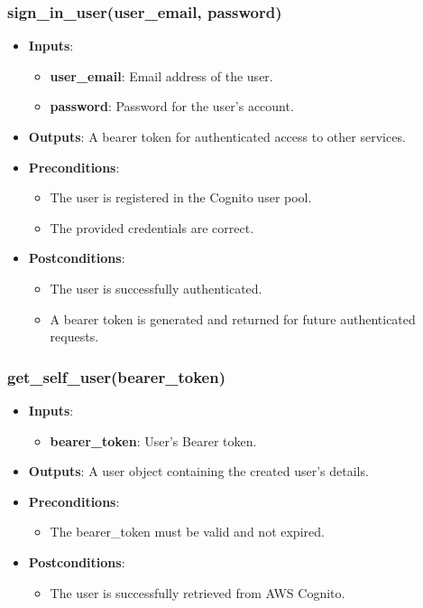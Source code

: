\documentclass[12pt, titlepage]{article}
\begin{document}
\subsubsection{sign\_in\_user(user\_email, password)}
\begin{itemize}
    \item \textbf{Inputs}:
        \begin{itemize}
            \item \textbf{user\_email}: Email address of the user.
            \item \textbf{password}: Password for the user's account.
        \end{itemize}
    \item \textbf{Outputs}: A bearer token for authenticated access to other services.
    \item \textbf{Preconditions}: 
        \begin{itemize}
            \item The user is registered in the Cognito user pool.
            \item The provided credentials are correct.
        \end{itemize}
    \item \textbf{Postconditions}: 
        \begin{itemize}
            \item The user is successfully authenticated.
            \item A bearer token is generated and returned for future authenticated requests.
        \end{itemize}
\end{itemize}

\subsubsection{get\_self\_user(bearer\_token)}
\begin{itemize}
    \item \textbf{Inputs}:
        \begin{itemize}
            \item \textbf{bearer\_token}: User's Bearer token.
        \end{itemize}
    \item \textbf{Outputs}: A user object containing the created user's details.
    \item \textbf{Preconditions}: 
        \begin{itemize}
            \item The bearer\_token must be valid and not expired.
        \end{itemize}
    \item \textbf{Postconditions}: 
        \begin{itemize}
            \item The user is successfully retrieved from AWS Cognito.
        \end{itemize}
\end{itemize}
\end{document}
